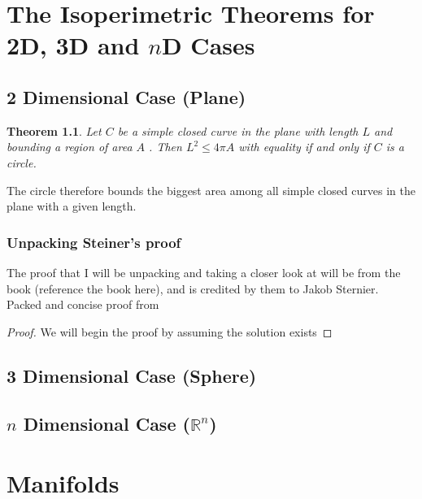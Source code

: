 \documentclass[a4paper]{book}
\newtheorem{theorem}{Theorem}%
\begin{document}
\chapter{The Isoperimetric Theorems for 2D, 3D and $n$D Cases}
\section{2 Dimensional Case (Plane)}
\begin{theorem}
    Let $C$ be a simple closed curve in the plane with length $L$ and bounding a region of area $A$ . 
    Then $L^2 \leq 4\pi A$ with equality if and only if $C$ is a circle.
\end{theorem}
The circle therefore bounds the biggest area among all simple closed curves in the plane with a given length.
\subsection{Unpacking Steiner's proof}
The proof that I will be unpacking and taking a closer look at will be from the book (reference the book here), and is credited by them to Jakob Sternier. Packed and concise proof from ~\cite{gluck2012isoperimetric}
\begin{proof}
    We will begin the proof by assuming the solution exists
\end{proof}

\section{3 Dimensional Case (Sphere)}

\section{$n$ Dimensional Case ($\mathbb{R}^n$)}

\chapter{Manifolds}



\end{document}
